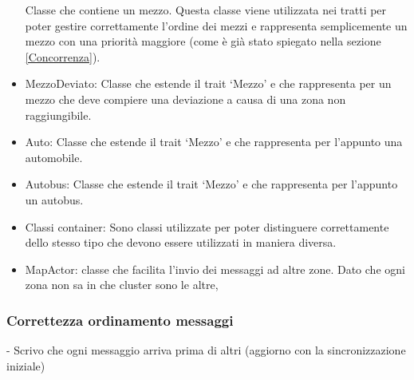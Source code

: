 \documentclass{article}
\begin{document}
\begin{itemize}
Classe che contiene un mezzo. Questa classe viene utilizzata nei tratti per poter gestire correttamente l'ordine dei mezzi e rappresenta semplicemente un mezzo con una priorit\`{a} maggiore (come \`{e} gi\`{a} stato spiegato nella sezione \ref{Concorrenza}).
\item {MezzoDeviato:}
Classe che estende il trait \lq Mezzo\rq{} e che rappresenta per un mezzo che deve compiere una deviazione a causa di una zona non raggiungibile. 
\item {Auto:}
Classe che estende il trait \lq Mezzo\rq{} e che rappresenta per l\textquoteright{}appunto una automobile. 
\item {Autobus:}
Classe che estende il trait \lq Mezzo\rq{} e che rappresenta per l\textquoteright{}appunto un autobus. 
\item {Classi container:}
Sono classi utilizzate per poter distinguere correttamente dello stesso tipo che devono essere utilizzati in maniera diversa. 








\color{red}\item {MapActor:} classe che facilita l'invio dei messaggi ad altre zone. Dato che ogni zona non sa in che cluster sono le altre, 









\end{itemize}
\subsubsection{Correttezza ordinamento messaggi}
- Scrivo che ogni messaggio arriva prima di altri (aggiorno con la sincronizzazione iniziale)
\end{document}
